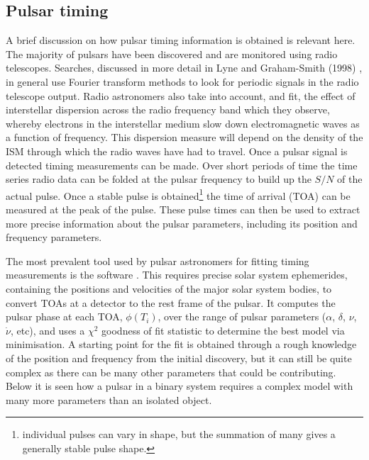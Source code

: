 \subsection{Pulsar timing}
A brief discussion on how pulsar timing information is obtained is relevant here. The majority of
pulsars have been discovered and are monitored using radio telescopes. Searches, discussed in
more detail in Lyne and Graham-Smith (1998) \cite{PulsarAstronomy}, in general use Fourier transform
methods to look for periodic signals in the radio telescope output. Radio astronomers also take
into account, and fit, the effect of interstellar dispersion across the radio frequency band which
they observe, whereby electrons in the interstellar medium slow down electromagnetic waves as
a function of frequency. This dispersion measure will depend on the density of the ISM through which
the radio waves have had to travel. Once a pulsar signal is detected timing measurements can be
made. Over short periods of time the time series radio data can be folded at the pulsar frequency to
build up the $S/N$ of the actual pulse. Once a stable pulse is obtained\footnote{individual pulses
can vary in shape, but the summation of many gives a generally stable pulse shape.} the time
of arrival (TOA) can be measured at the peak of the pulse. 
These pulse times can then be used to extract more precise information about the pulsar parameters,
including its position and frequency parameters. 

The most prevalent tool used by pulsar astronomers for fitting timing measurements is the \tempo
software \cite{TEMPO}. This requires precise solar system ephemerides, containing the positions and
velocities of the major solar system bodies, to convert TOAs at a detector to the rest frame of
the pulsar. It computes the pulsar phase at each TOA, $\phi(T_i)$, over the range of pulsar
parameters ($\alpha$, $\delta$, $\nu$, $\dot{\nu}$, etc), and uses a $\chi^2$ goodness of fit
statistic to determine the best model via minimisation. A starting point for the fit is obtained
through a rough knowledge of the position and frequency from the initial discovery, but it can still
be quite complex as there can be many other parameters that could be contributing. Below it is seen
how a pulsar in a binary system requires a complex model with many more parameters than an isolated
object.

